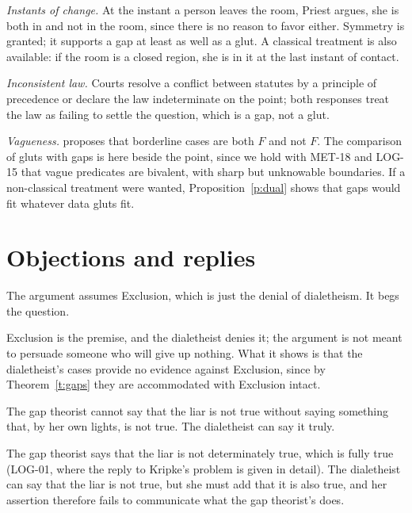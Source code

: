 \documentclass{situationist-preprint}
\begin{document}
\emph{Instants of change.} At the instant a person leaves the room, Priest argues, she is both in and not in the room, since there is no reason to favor either. Symmetry is granted; it supports a gap at least as well as a glut. A classical treatment is also available: if the room is a closed region, she is in it at the last instant of contact.

\emph{Inconsistent law.} Courts resolve a conflict between statutes by a principle of precedence or declare the law indeterminate on the point; both responses treat the law as failing to settle the question, which is a gap, not a glut.

\emph{Vagueness.} \citet{Hyde1997} proposes that borderline cases are both $F$ and not $F$. The comparison of gluts with gaps is here beside the point, since we hold with MET-18 and LOG-15 that vague predicates are bivalent, with sharp but unknowable boundaries. If a non-classical treatment were wanted, Proposition~\ref{p:dual} shows that gaps would fit whatever data gluts fit.

\section{Objections and replies}

\begin{objection}
The argument assumes Exclusion, which is just the denial of dialetheism. It begs the question.
\end{objection}

\begin{reply}
Exclusion is the premise, and the dialetheist denies it; the argument is not meant to persuade someone who will give up nothing. What it shows is that the dialetheist's cases provide no evidence against Exclusion, since by Theorem~\ref{t:gaps} they are accommodated with Exclusion intact.
\end{reply}

\begin{objection}
The gap theorist cannot say that the liar is not true without saying something that, by her own lights, is not true. The dialetheist can say it truly.
\end{objection}

\begin{reply}
The gap theorist says that the liar is not determinately true, which is fully true (LOG-01, where the reply to Kripke's problem is given in detail). The dialetheist can say that the liar is not true, but she must add that it is also true, and her assertion therefore fails to communicate what the gap theorist's does.
\end{reply}
\end{document}
